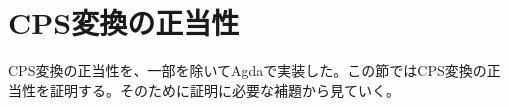 \documentclass[japanese,draft]{jssst_ppl} %
\begin{document}







\section{CPS変換の正当性}
CPS変換の正当性を、一部を除いてAgdaで実装した。この節ではCPS変換の正当性を証明する。そのために証明に必要な補題から見ていく。
\end{document}
